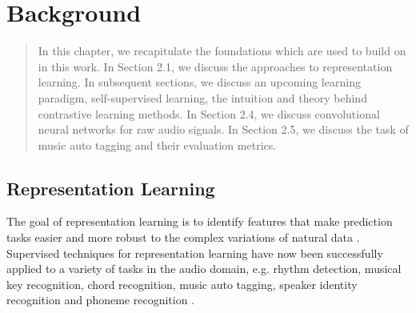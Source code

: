 \chapter{Background}\label{sec:background}
\begin{quote}
    In this chapter, we recapitulate the foundations which are used to build on in this work.
    In Section 2.1, we discuss the approaches to representation learning.
    In subsequent sections, we discuss an upcoming learning paradigm, self-supervised learning, the intuition and theory behind contrastive learning methods.
    In Section 2.4, we discuss convolutional neural networks for raw audio signals.
    In Section 2.5, we discuss the task of music auto tagging and their evaluation metrics.
\end{quote}


\section{Representation Learning}


The goal of representation learning is to identify features that make  prediction tasks easier and more robust to the complex variations of natural data \cite{bengio2013representation}.
Supervised techniques for representation learning have now been successfully applied to a variety of tasks in the audio domain, e.g. rhythm detection, musical key recognition, chord recognition, music auto tagging, speaker identity recognition and phoneme recognition  \cite{korzeniowski_fully_2016, chen_harmony_2019, korzeniowski_end--end_2017, bock_joint_2016, pons_end--end_2017, van_den_oord_deep_2013}.


